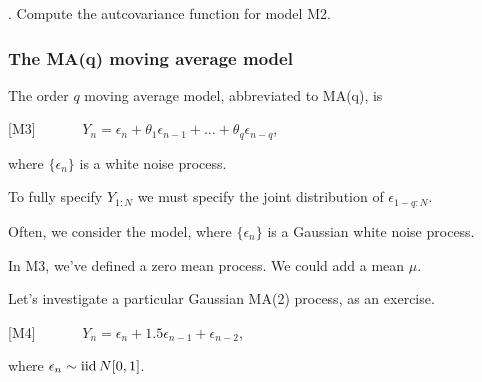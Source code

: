 \begin{frame}

\myquestion. Compute the autcovariance function for model M2.


\end{frame}



\begin{frame}[fragile]

\frametitle{The MA(q) moving average model}

\bi
\item The order $q$ moving average model, abbreviated to MA(q), is

\vspace{2mm}

[M3] $\quad\quad \quad Y_n =  \epsilon_n +\theta_1 \epsilon_{n-1} +\dots+\theta_q\epsilon_{n-q}$,

\vspace{2mm}

where $\{\epsilon_n\}$ is a white noise process. 

\item To fully specify $Y_{1:N}$ we must specify the joint distribution of $\epsilon_{1-q:N}$.

\item Often, we consider the  model, where  $\{\epsilon_n\}$ is a Gaussian white noise process. 

\item In M3, we've defined a zero mean process. We could add a mean $\mu$.

\item Let's investigate a particular Gaussian MA(2) process, as an exercise.

\vspace{2mm}

[M4] $\quad\quad \quad Y_n = \epsilon_n + 1.5\epsilon_{n-1}+\epsilon_{n-2}$,

\vspace{2mm}

where $\epsilon_n\sim \mathrm{iid} \,  N[0,1]$.
\ei

\end{frame}



